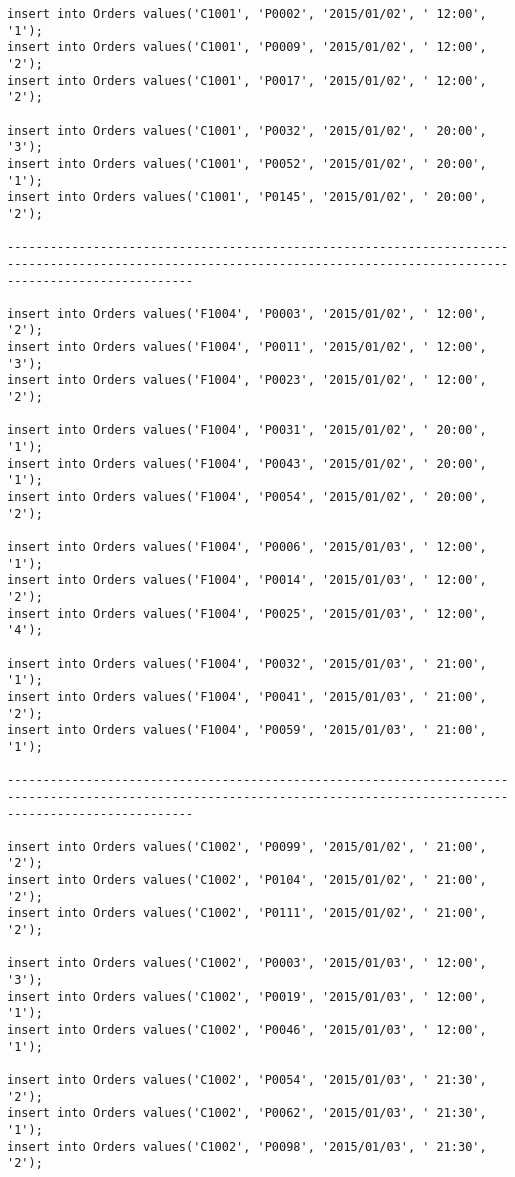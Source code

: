 \documentclass[a4,12pt]{report}
\begin{document}
\begin{lstlisting}
insert into Orders values('C1001', 'P0002', '2015/01/02', ' 12:00', '1');
insert into Orders values('C1001', 'P0009', '2015/01/02', ' 12:00', '2');
insert into Orders values('C1001', 'P0017', '2015/01/02', ' 12:00', '2');

insert into Orders values('C1001', 'P0032', '2015/01/02', ' 20:00', '3');
insert into Orders values('C1001', 'P0052', '2015/01/02', ' 20:00', '1');
insert into Orders values('C1001', 'P0145', '2015/01/02', ' 20:00', '2');

----------------------------------------------------------------------------------------------------------------------------------------------------------------------

insert into Orders values('F1004', 'P0003', '2015/01/02', ' 12:00', '2');
insert into Orders values('F1004', 'P0011', '2015/01/02', ' 12:00', '3');
insert into Orders values('F1004', 'P0023', '2015/01/02', ' 12:00', '2');

insert into Orders values('F1004', 'P0031', '2015/01/02', ' 20:00', '1');
insert into Orders values('F1004', 'P0043', '2015/01/02', ' 20:00', '1');
insert into Orders values('F1004', 'P0054', '2015/01/02', ' 20:00', '2');

insert into Orders values('F1004', 'P0006', '2015/01/03', ' 12:00', '1');
insert into Orders values('F1004', 'P0014', '2015/01/03', ' 12:00', '2');
insert into Orders values('F1004', 'P0025', '2015/01/03', ' 12:00', '4');

insert into Orders values('F1004', 'P0032', '2015/01/03', ' 21:00', '1');
insert into Orders values('F1004', 'P0041', '2015/01/03', ' 21:00', '2');
insert into Orders values('F1004', 'P0059', '2015/01/03', ' 21:00', '1');

----------------------------------------------------------------------------------------------------------------------------------------------------------------------

insert into Orders values('C1002', 'P0099', '2015/01/02', ' 21:00', '2');
insert into Orders values('C1002', 'P0104', '2015/01/02', ' 21:00', '2');
insert into Orders values('C1002', 'P0111', '2015/01/02', ' 21:00', '2');

insert into Orders values('C1002', 'P0003', '2015/01/03', ' 12:00', '3');
insert into Orders values('C1002', 'P0019', '2015/01/03', ' 12:00', '1');
insert into Orders values('C1002', 'P0046', '2015/01/03', ' 12:00', '1');

insert into Orders values('C1002', 'P0054', '2015/01/03', ' 21:30', '2');
insert into Orders values('C1002', 'P0062', '2015/01/03', ' 21:30', '1');
insert into Orders values('C1002', 'P0098', '2015/01/03', ' 21:30', '2');


\end{lstlisting}
\end{document}
